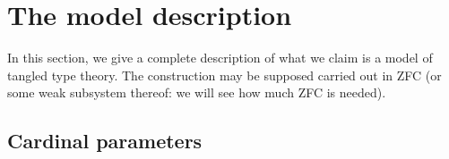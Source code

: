 









\chapter{The model description}

In this section, we give a complete description of what we claim is a model of tangled type theory.  The construction may be supposed carried out in ZFC (or some weak subsystem thereof:  we will see how much ZFC is needed).

\section{Cardinal parameters}

